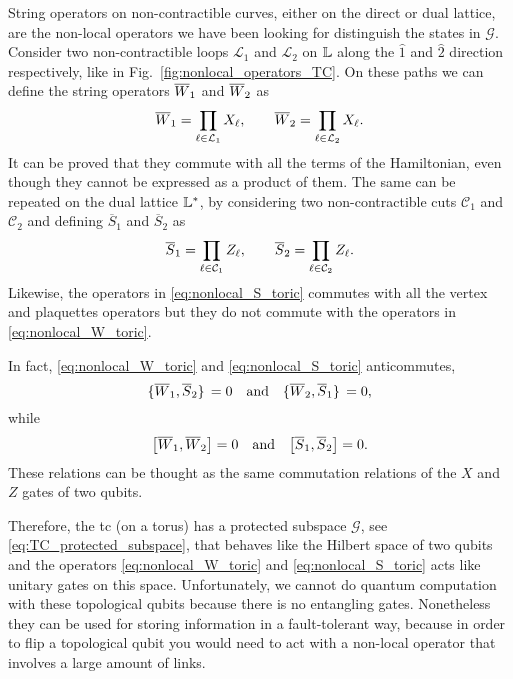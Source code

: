 String operators on non-contractible curves, either on the direct or dual lattice, are the non-local operators we have been looking for distinguish the states in $\mathcal{G}$.
Consider two non-contractible loops $\mathcal{L}_{1}$ and $\mathcal{L}_{2}$ on $\mathbb{L}$ along the $\hat{1}$ and $\hat{2}$ direction respectively, like in Fig.~\ref{fig:nonlocal_operators_TC}.
On these paths we can define the string operators $\overline{W}_1$ and $\overline{W}_2$ as
\begin{equation}
    \overline{W}_1 = \prod_{\ell \in \mathcal{L}_1} X_\ell, \qquad
    \overline{W}_2 = \prod_{\ell \in \mathcal{L}_2} X_\ell.
    \label{eq:nonlocal_W_toric}
\end{equation}
It can be proved that they commute with all the terms of the Hamiltonian, even though they cannot be expressed as a product of them.
The same can be repeated on the dual lattice $\mathbb{L}^{\ast}$, by considering two non-contractible cuts $\mathcal{C}_1$ and $\mathcal{C}_2$ and defining $\overline{S}_1$ and $\overline{S}_2$ as
\begin{equation}
    \overline{S}_1 = \prod_{\ell \in \mathcal{C}_1} Z_\ell, \qquad
    \overline{S}_2 = \prod_{\ell \in \mathcal{C}_2} Z_\ell.
    \label{eq:nonlocal_S_toric}
\end{equation}
Likewise, the operators in \eqref{eq:nonlocal_S_toric} commutes with all the vertex and plaquettes operators but they do not commute with the operators in \eqref{eq:nonlocal_W_toric}.

In fact, \eqref{eq:nonlocal_W_toric} and \eqref{eq:nonlocal_S_toric} anticommutes,
\begin{equation}
    \acomm*{\Wilson_1}{\overline{S}_2} = 0 \qand
    \acomm*{\Wilson_2}{\overline{S}_1} = 0,
    \label{eq:anticommutation_W_S_toric}
\end{equation}
while
\begin{equation}
    \comm{\Wilson_1}{\Wilson_2} = 0 \qand
    \comm{\overline{S}_1}{\overline{S}_2} = 0.
\end{equation}
These relations can be thought as the same commutation relations of the $X$ and $Z$ gates of two qubits.

Therefore, the \ac{tc} (on a torus) has a protected subspace $\mathcal{G}$, see \eqref{eq:TC_protected_subspace}, that behaves like the Hilbert space of two qubits and the operators \eqref{eq:nonlocal_W_toric} and \eqref{eq:nonlocal_S_toric} acts like unitary gates on this space.
Unfortunately, we cannot do quantum computation with these topological qubits because there is no entangling gates.
Nonetheless they can be used for storing information in a fault-tolerant way, because in order to flip a topological qubit you would need to act with a non-local operator that involves a large amount of links.



